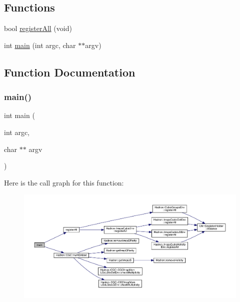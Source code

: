 \subsection*{Functions}
\begin{DoxyCompactItemize}
\item 
bool \mbox{\hyperlink{adat-devel_2main_2irreputils_2num__embed__check_8cc_a3872416cf70cb24d7da1008a3f3b1d96}{register\+All}} (void)
\item 
int \mbox{\hyperlink{adat-devel_2main_2irreputils_2num__embed__check_8cc_a3c04138a5bfe5d72780bb7e82a18e627}{main}} (int argc, char $\ast$$\ast$argv)
\end{DoxyCompactItemize}


\subsection{Function Documentation}
\mbox{\label{adat-devel_2main_2irreputils_2num__embed__check_8cc_a3c04138a5bfe5d72780bb7e82a18e627}} 
\subsubsection{\texorpdfstring{main()}{main()}}
{\footnotesize\ttfamily int main (\begin{DoxyParamCaption}\item[{int}]{argc,  }\item[{char $\ast$$\ast$}]{argv }\end{DoxyParamCaption})}

Here is the call graph for this function\+:
\nopagebreak
\begin{figure}[H]
\begin{center}
\leavevmode
\includegraphics[width=350pt]{d7/d18/adat-devel_2main_2irreputils_2num__embed__check_8cc_a3c04138a5bfe5d72780bb7e82a18e627_cgraph}
\end{center}
\end{figure}
\mbox{\label{adat-devel_2main_2irreputils_2num__embed__check_8cc_a3872416cf70cb24d7da1008a3f3b1d96}} 
